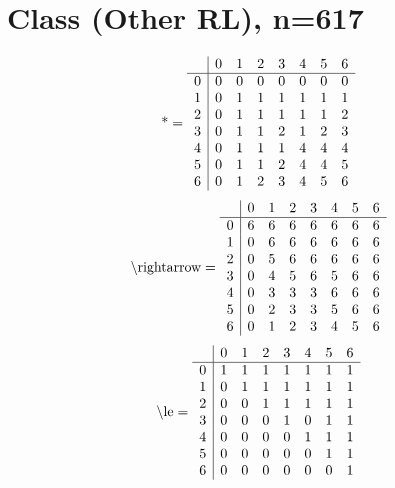 \documentclass[11pt]{article}
\begin{document}
\section{Class (Other RL), n=617}
\[\text{*} = 
\begin{array}{r | r r r r r r r}
 & 0 & 1 & 2 & 3 & 4 & 5 & 6 \\ \hline
0 & 0 & 0 & 0 & 0 & 0 & 0 & 0 \\
1 & 0 & 1 & 1 & 1 & 1 & 1 & 1 \\
2 & 0 & 1 & 1 & 1 & 1 & 1 & 2 \\
3 & 0 & 1 & 1 & 2 & 1 & 2 & 3 \\
4 & 0 & 1 & 1 & 1 & 4 & 4 & 4 \\
5 & 0 & 1 & 1 & 2 & 4 & 4 & 5 \\
6 & 0 & 1 & 2 & 3 & 4 & 5 & 6 \\
\end{array}
\]
\[\text{\textbackslash rightarrow} = 
\begin{array}{r | r r r r r r r}
 & 0 & 1 & 2 & 3 & 4 & 5 & 6 \\ \hline
0 & 6 & 6 & 6 & 6 & 6 & 6 & 6 \\
1 & 0 & 6 & 6 & 6 & 6 & 6 & 6 \\
2 & 0 & 5 & 6 & 6 & 6 & 6 & 6 \\
3 & 0 & 4 & 5 & 6 & 5 & 6 & 6 \\
4 & 0 & 3 & 3 & 3 & 6 & 6 & 6 \\
5 & 0 & 2 & 3 & 3 & 5 & 6 & 6 \\
6 & 0 & 1 & 2 & 3 & 4 & 5 & 6 \\
\end{array}
\]
\[\text{\textbackslash le} = 
\begin{array}{r | r r r r r r r}
 & 0 & 1 & 2 & 3 & 4 & 5 & 6 \\ \hline
0 & 1 & 1 & 1 & 1 & 1 & 1 & 1 \\
1 & 0 & 1 & 1 & 1 & 1 & 1 & 1 \\
2 & 0 & 0 & 1 & 1 & 1 & 1 & 1 \\
3 & 0 & 0 & 0 & 1 & 0 & 1 & 1 \\
4 & 0 & 0 & 0 & 0 & 1 & 1 & 1 \\
5 & 0 & 0 & 0 & 0 & 0 & 1 & 1 \\
6 & 0 & 0 & 0 & 0 & 0 & 0 & 1 \\
\end{array}
\]
\end{document}
